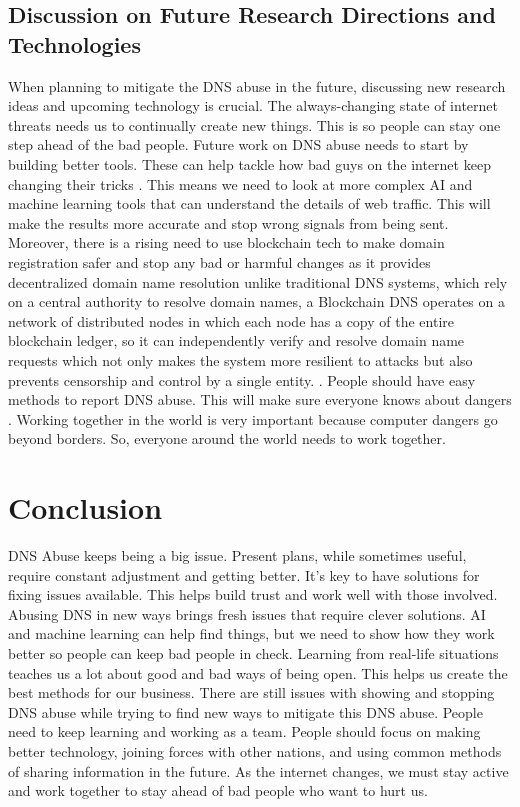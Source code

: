 \subsection{Discussion on Future Research Directions and Technologies}

When planning to mitigate the DNS abuse in the future, discussing new research ideas and upcoming technology is crucial. The always-changing state of internet threats needs us to continually create new things. This is so people can stay one step ahead of the bad people. Future work on DNS abuse needs to start by building better tools. These can help tackle how bad guys on the internet keep changing their tricks \cite{bovenzi2023blockchain}. This means we need to look at more complex AI and machine learning tools that can understand the details of web traffic. This will make the results more accurate and stop wrong signals from being sent. Moreover, there is a rising need to use blockchain tech to make domain registration safer and stop any bad or harmful changes as it provides decentralized domain name resolution unlike traditional DNS systems, which rely on a central authority to resolve domain names, a Blockchain DNS operates on a network of distributed nodes in which each node has a copy of the entire blockchain ledger, so it can independently verify and resolve domain name requests which not only makes the system more resilient to attacks but also prevents censorship and control by a single entity. \cite{FinanceStrategists2023BlockchainDNS}.  People should have easy methods to report DNS abuse. This will make sure everyone knows about dangers \cite{gu2021iot}. Working together in the world is very important because computer dangers go beyond borders. So, everyone around the world needs to work together. 


\section{Conclusion}

DNS Abuse keeps being a big issue. Present plans, while sometimes useful, require constant adjustment and getting better. It's key to have solutions for fixing issues available. This helps build trust and work well with those involved. Abusing DNS in new ways brings fresh issues that require clever solutions. AI and machine learning can help find things, but we need to show how they work better so people can keep bad people in check. Learning from real-life situations teaches us a lot about good and bad ways of being open. This helps us create the best methods for our business. There are still issues with showing and stopping DNS abuse while trying to find new ways to mitigate this DNS abuse. People need to keep learning and working as a team. People should focus on making better technology, joining forces with other nations, and using common methods of sharing information in the future. As the internet changes, we must stay active and work together to stay ahead of bad people who want to hurt us. 


